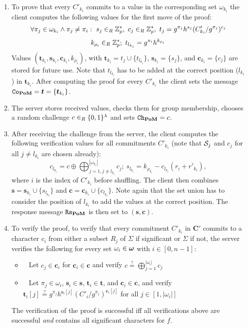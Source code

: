 \begin{enumerate}
  \item To prove that every $C'_{{k_i}}$ commits to a value in the corresponding set $\omega_{{k_i}}$ the client computes the following values for the first move of the proof:
    \[
      \forall \pi_j\in\omega_{{k_i}} \wedge \pi_j\not=\pi_i :~ s_j\in_R\mathbb{Z}^\ast_p,~ c_j\in_R\mathbb{Z}^\ast_p,~ t_j=g^{\pi_j}h^{s_j}(C'_{{k_i}}/g^{\pi_j})^{c_j}
    \]
    \[
      k_{\rho_i}\in_R\mathbb{Z}^\ast_p;~ t_{l_{k_i}}=g^{\pi_i}h^{k_{\rho_i}}
    \]
    Values $(\bm t_{k_i}, \bm s_{k_i}, \bm c_{k_i}, k_{\rho_i})$, with $\bm t_{k_i}= t_j \cup \{t_{l_{k_i}}\}$, $\bm s_{k_i}=\{s_j\}$, and $\bm c_{k_i}=\{c_j\}$ are stored for future use.
    Note that $t_{l_{k_i}}$ has to be added at the correct position ($l_{k_i}$) in $\bm t_{k_i}$.
    After computing the proof for every $C'_{k_i}$ the client sets the message $\mathtt{Co}_\mathsf{\bf PoM}=\bm t = \{\bm t_{k_i}\}$.
    
  \item The server stores received values, checks them for group membership, chooses a random challenge $c\in_R\{0,1\}^\lambda$ and sets $\mathtt{Ch}_\mathsf{\bf PoM}=c$.
  
  \item After receiving the challenge \Client from the server, the client computes the following verification values for all commitments $C'_{{k_i}}$ (note that $\mathcal{S}_j$ and $c_j$ for all $j\not= l_{k_i}$ are chosen already):
    \[
      c_{l_{k_i}}=c\oplus \bigoplus_{j=1,j\not=l_{k_i}}^{|\omega_{k_i}|} c_j;~ s_{l_{k_i}}=k_{\rho_{k_i}} - c_{l_{k_i}}(r_{i}+r'_{k_i}),
    \]
    where $i$ is the index of $C'_{k_i}$ before shuffling.
    The client then combines $\bm s = \bm s_{k_i} \cup \{s_{l_{k_i}}\}$ and $\bm c = \bm c_{k_i} \cup \{c_{l_{k_i}}\}$.
    Note again that the set union has to consider the position of $l_{k_i}$ to add the values at the correct position.
    The response message $\mathtt{Rs}_\mathsf{\bf PoM}$ is then set to $(\bm s, \bm c)$.
  
  \item To verify the proof, \ie to verify that every commitment $C'_{k_i}$ in $\bm C'$ commits to a character $c_i$ from either a subset $R_j$ of $\Sigma$ if significant or $\Sigma$ if not, the server verifies the following for every set $\omega_{i} \in \boldsymbol{\mathbf{\omega}}$ with $i\in[0,n-1]$:
    \begin{itemize}
      \item~ Let $c_j\in\bm c_i$ for $\bm c_i\in\bm c$ and verify
            $c\stackrel{?}{=}\bigoplus_{j=1}^{|\omega_i|}c_j$
      \item~ Let $\pi_j\in\omega_{i}$, $\bm s_i \in \bm s$, $\bm t_i\in \bm t$, and $\bm c_i \in \bm c$, and verify
            $\displaystyle \bm t_{i}[j]\stackrel{?}{=}g^{\pi_j}h^{\bm s_i[j]}(C'_i/g^{\pi_j})^{\bm c_i[j]}$
            for all $j\in[1,|\omega_{i}|]$
    \end{itemize}
    The verification of the proof is successful iff all verifications above are successful \emph{and} \vect{\omega} contains all significant characters for $f$.
\end{enumerate}

